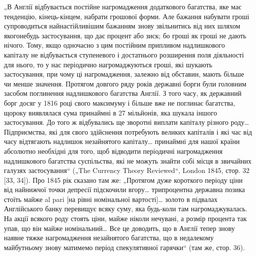„В Англії відбувається постійне нагромадження додаткового
багатства, яке має тенденцію, кінець-кінцем, набрати грошової
форми. Але бажання набувати гроші супроводиться найнастійливішим бажанням знову звільнитись від них
шляхом якогонебудь
застосування, що дає процент або зиск; бо гроші як гроші не
дають нічого. Тому, якщо одночасно з цим постійним припливом надлишкового капіталу не відбувається
ступеневого і достатнього розширення поля діяльності для нього, то у нас
періодично нагромаджуються гроші, які шукають застосування,
при чому ці нагромадження, залежно від обставин, мають
більше чи менше значення. Протягом довгого ряду років державні борги були головним засобом
поглинення надлишкового
багатства Англії. З того часу, як державний борг досяг у
1816 році свого максимуму і більше вже не поглинає багатства, щороку виявлялася сума принаймні в 27
мільйонів, яка
шукала іншого застосування. До того ж відбувались ще зворотні
виплати капіталу різного роду\dots{} Підприємства, які для свого
здійснення потребують великих капіталів і які час від часу
відтягають надлишок незайнятого капіталу\dots{} принаймні для нашої країни абсолютно необхідні для того,
щоб відводити періодичні нагромадження надлишкового багатства суспільства, які не
можуть знайти собі місця в звичайних галузях застосування“
(„The Currency Theory Reviewed“, London 1845, стор. 32 [33, 34]).
Про 1845 рік сказано там же: „Протягом дуже короткого періоду ціни від найнижчої точки депресії
підскочили вгору\dots{} трипроцентна державна позика стоїть майже al pari [на рівні номінальної
вартості]\dots{} золото в підвалах Англійського банку перевищує всяку суму, яка будь-коли там
нагромаджувалась. На
акції всякого роду стоять ціни, майже ніколи нечувані, а розмір
процента так упав, що він майже номінальний\dots{} Все це доводить,
що в Англії тепер знову наявне тяжке нагромадження незайнятого
багатства, що в недалекому майбутньому знову матимемо період
спекулятивної гарячки“ (там же, стор. 36).

